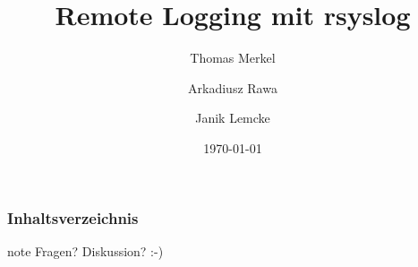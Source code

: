 \documentclass[10pt,a4paper]{beamer}
\title{Remote Logging mit rsyslog}
\author{Thomas Merkel \and Arkadiusz Rawa \and Janik Lemcke}
\institute{Hochschule Ravensburg-Weingarten}
\date{\today}
\begin{document}
	\begin{frame}
		\titlepage
	\end{frame} 

	\begin{frame}
		\frametitle{Inhaltsverzeichnis}
		\tableofcontents
	\end{frame} 
	
	
	
	

	\begin{frame}
		\begin{beamercolorbox}[center,shadow=true,rounded=true,]{note} 
        	Fragen? Diskussion? :-)
		\end{beamercolorbox} 
	\end{frame}
\end{document}
